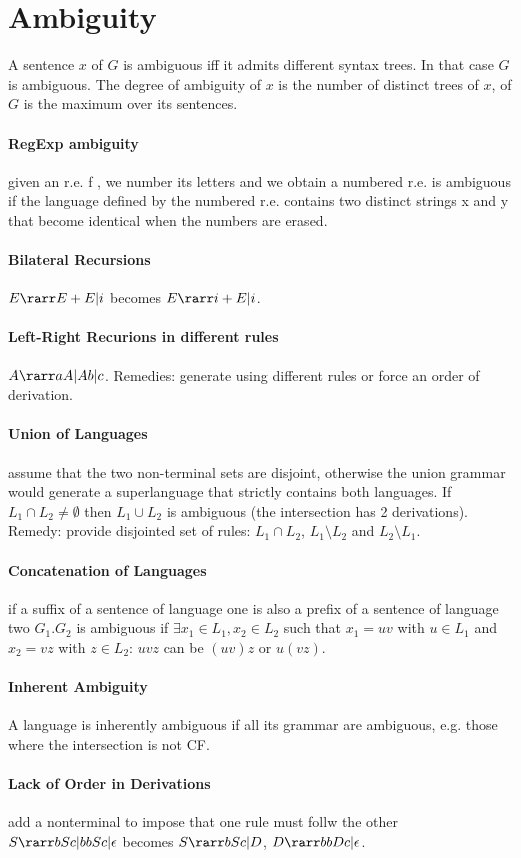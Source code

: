 \section{Ambiguity}

A sentence $x$ of $G$ is ambiguous iff it admits different syntax trees. In that case $G$ is ambiguous. The degree of ambiguity of $x$ is the number of distinct trees of $x$, of $G$ is the maximum over its sentences.

\paragraph{RegExp ambiguity} given an r.e. f , we number its letters and we obtain a numbered r.e. is ambiguous if the language defined by the numbered r.e. contains two distinct strings x and y that become identical when the numbers are erased.


\paragraph{Bilateral Recursions} $E \rarr E + E | i$ becomes $E \rarr i + E | i$.

\paragraph{Left-Right Recurions in different rules} $A \rarr aA | Ab | c$. Remedies: generate using different rules or force an order of derivation.

\paragraph{Union of Languages} assume that the two non-terminal sets are disjoint, otherwise the union grammar would generate
a superlanguage that strictly contains both languages. If $L_1 \cap L_2 \ne \emptyset$ then $L_1 \cup L_2$ is ambiguous (the intersection has 2 derivations). Remedy: provide disjointed set of rules: $L_1 \cap L_2$, $L_1 \setminus L_2$ and $L_2 \setminus L_1$.

\paragraph{Concatenation of Languages} if a suffix of a sentence of language one is also a prefix of a sentence of language two $G_1 . G_2$ is ambiguous if $\exists x_1 \in L_1, x_2 \in L_2$ such that $x_1 = uv$ with $u \in L_1$ and $x_2 = vz$ with $z \in L_2$: $uvz$ can be $(uv)z$ or $u(vz)$.

\paragraph{Inherent Ambiguity} A language is inherently ambiguous if all its grammar are ambiguous, e.g. those where the intersection is not CF.

\paragraph{Lack of Order in Derivations} add a nonterminal to impose that one rule must follw the other $S \rarr bSc | bbSc | \epsilon$ becomes $S \rarr bSc | D$, $D \rarr bbDc | \epsilon$.
